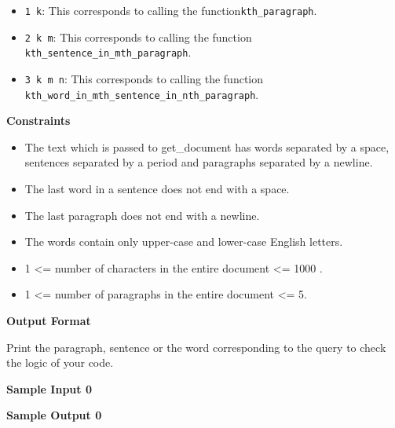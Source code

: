 \begin{itemize}
\tightlist
\item
  \texttt{1\ k}: This corresponds to calling the
  function\texttt{kth\_paragraph}.
\item
  \texttt{2\ k\ m}: This corresponds to calling the function
  \texttt{kth\_sentence\_in\_mth\_paragraph}.
\item
  \texttt{3\ k\ m\ n}: This corresponds to calling the function
  \texttt{kth\_word\_in\_mth\_sentence\_in\_nth\_paragraph}.
\end{itemize}

\textbf{Constraints}

\begin{itemize}
\tightlist
\item
  The text which is passed to get\_document has words separated by a
  space, sentences separated by a period and paragraphs separated by a
  newline.
\item
  The last word in a sentence does not end with a space.
\item
  The last paragraph does not end with a newline.
\item
  The words contain only upper-case and lower-case English letters.
\item
  1 \textless= number of characters in the entire document \textless=
  1000 .
\item
  1 \textless= number of paragraphs in the entire document \textless= 5.
\end{itemize}

\textbf{Output Format}

Print the paragraph, sentence or the word corresponding to the query to
check the logic of your code.

\textbf{Sample Input 0}

\begin{Shaded}
\begin{Highlighting}[]
 
  
   
\end{Highlighting}
\end{Shaded}

\textbf{Sample Output 0}

\begin{Shaded}
\begin{Highlighting}[]
\end{Highlighting}
\end{Shaded}

